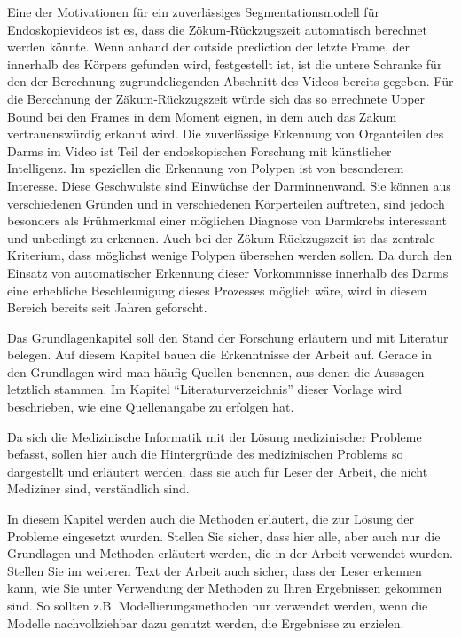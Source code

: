 \citep{kaminski-performance-2017}
Eine der Motivationen für ein zuverlässiges Segmentationsmodell für Endoskopievideos ist es, 
dass die Zökum-Rückzugszeit automatisch berechnet werden könnte. Wenn anhand der outside prediction der letzte Frame, 
der innerhalb des Körpers gefunden wird, festgestellt ist, ist die untere Schranke für den der Berechnung zugrundeliegenden Abschnitt des 
Videos bereits gegeben. Für die Berechnung der Zäkum-Rückzugszeit würde sich das so errechnete Upper Bound bei den Frames in dem Moment eignen, 
in dem auch das Zäkum vertrauenswürdig erkannt wird. Die zuverlässige Erkennung von Organteilen des Darms im Video ist 
Teil der endoskopischen Forschung mit künstlicher Intelligenz. Im speziellen die Erkennung von Polypen ist von besonderem Interesse. 
Diese Geschwulste sind Einwüchse der Darminnenwand. Sie können aus verschiedenen Gründen und in verschiedenen Körperteilen auftreten, 
sind jedoch besonders als Frühmerkmal einer möglichen Diagnose von Darmkrebs interessant und unbedingt zu erkennen. \citep{doi:10.7326/0003-4819-157-4-201208210-00002}
Auch bei der Zökum-Rückzugszeit ist das zentrale Kriterium, dass möglichst wenige Polypen übersehen werden sollen. 
Da durch den Einsatz von automatischer Erkennung dieser Vorkommnisse innerhalb des Darms eine erhebliche Beschleunigung dieses 
Prozesses möglich wäre, wird in diesem Bereich bereits seit Jahren geforscht. \citep{talukder-2022}


Das Grundlagenkapitel soll den Stand der Forschung erläutern und mit Literatur belegen.
Auf diesem Kapitel bauen die Erkenntnisse der Arbeit auf.
Gerade in den Grundlagen wird man häufig Quellen benennen, aus denen die Aussagen letztlich stammen.
Im Kapitel \enquote{Literaturverzeichnis} dieser Vorlage wird beschrieben, wie eine Quellenangabe zu erfolgen hat.

Da sich die Medizinische Informatik mit der Lösung medizinischer Probleme befasst, sollen hier auch die Hintergründe des medizinischen Problems so dargestellt und erläutert werden, dass sie auch für Leser der Arbeit, die nicht Mediziner sind, verständlich sind.

In diesem Kapitel werden auch die Methoden erläutert, die zur Lösung der Probleme eingesetzt wurden.
Stellen Sie sicher, dass hier alle, aber auch nur die Grundlagen und Methoden erläutert werden, die in der Arbeit verwendet wurden.
Stellen Sie im weiteren Text der Arbeit auch sicher, dass der Leser erkennen kann, wie Sie unter Verwendung der Methoden zu Ihren Ergebnissen gekommen sind.
So sollten z.B. Modellierungsmethoden nur verwendet werden, wenn die Modelle nachvollziehbar dazu genutzt werden, die Ergebnisse zu erzielen.

